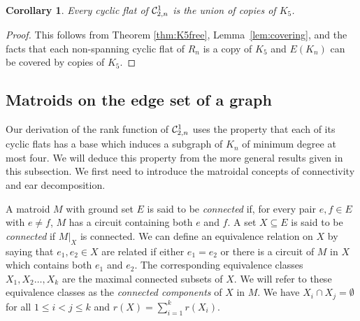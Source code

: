 \documentclass{daj}
\newtheorem{corollary}[thm]{Corollary}\theoremstyle{plain}
\begin{document}
\begin{corollary}\label{cor:maximal}
Every cyclic flat of ${\cal C}^1_{2,n}$ is the union of copies of $K_5$.
\end{corollary}
\begin{proof}
This follows from Theorem \ref{thm:K5free},
 Lemma~\ref{lem:covering}, and the facts that each non-spanning cyclic flat of $R_n$ is a copy of $K_5$ and  $E(K_n)$ can be covered by copies of $K_5$.
\end{proof}

\subsection{Matroids  on the edge set of a graph}
Our derivation of the rank function of ${\cal C}^1_{2,n}$ uses the property that each of its cyclic flats  has a base which induces a subgraph of $K_n$ of minimum degree at most four.  We will deduce this property from the more general results given in this subsection.
We first need to introduce the matroidal concepts of connectivity and ear decomposition.

A matroid ${M}$ with ground set $E$ is said to be {\em connected} if, for every pair $e, f\in E$ with $e\neq f$, $M$ has a circuit containing both $e$ and $f$.
A set $X\subseteq E$ is said to be {\em connected} if $M|_X$ is connected. We can define an equivalence relation on $X$ by saying that $e_1,e_2\in X$ are related if either $e_1=e_2$ or there is a circuit of $M$ in $X$ which contains both $e_1$ and $e_2$.
The corresponding equivalence classes $X_1,X_2\ldots, X_k$ are the maximal connected subsets of $X$. We will refer to these equivalence classes as the {\em connected components} of $X$ in $M$. We have $X_i\cap X_j=\emptyset$ for all $1\leq i<j\leq k$ and $r(X)=\sum_{i=1}^k r(X_i)$.
\end{document}
